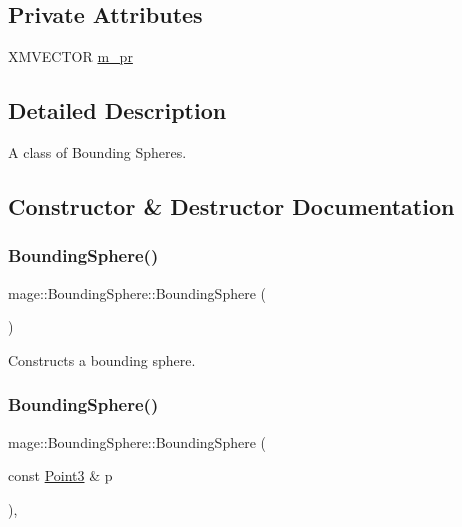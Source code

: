 \subsection*{Private Attributes}
\begin{DoxyCompactItemize}
\item 
X\+M\+V\+E\+C\+T\+OR \hyperlink{classmage_1_1_bounding_sphere_a787aea4f26cca30e3c30d85da3533b9d}{m\+\_\+pr}
\end{DoxyCompactItemize}


\subsection{Detailed Description}
A class of Bounding Spheres. 

\subsection{Constructor \& Destructor Documentation}
\hypertarget{classmage_1_1_bounding_sphere_a3bf22ae012630101af6578173958aebc}{}\label{classmage_1_1_bounding_sphere_a3bf22ae012630101af6578173958aebc} 
\subsubsection{\texorpdfstring{Bounding\+Sphere()}{BoundingSphere()}\hspace{0.1cm}{\footnotesize\ttfamily [1/8]}}
{\footnotesize\ttfamily mage\+::\+Bounding\+Sphere\+::\+Bounding\+Sphere (\begin{DoxyParamCaption}{ }\end{DoxyParamCaption})\hspace{0.3cm}{\ttfamily [noexcept]}}

Constructs a bounding sphere. \hypertarget{classmage_1_1_bounding_sphere_a8f70fd7013b1d2a22545ab659847840f}{}\label{classmage_1_1_bounding_sphere_a8f70fd7013b1d2a22545ab659847840f} 
\subsubsection{\texorpdfstring{Bounding\+Sphere()}{BoundingSphere()}\hspace{0.1cm}{\footnotesize\ttfamily [2/8]}}
{\footnotesize\ttfamily mage\+::\+Bounding\+Sphere\+::\+Bounding\+Sphere (\begin{DoxyParamCaption}\item[{const \hyperlink{structmage_1_1_point3}{Point3} \&}]{p }\end{DoxyParamCaption})\hspace{0.3cm}{\ttfamily [explicit]}, {\ttfamily [noexcept]}}

